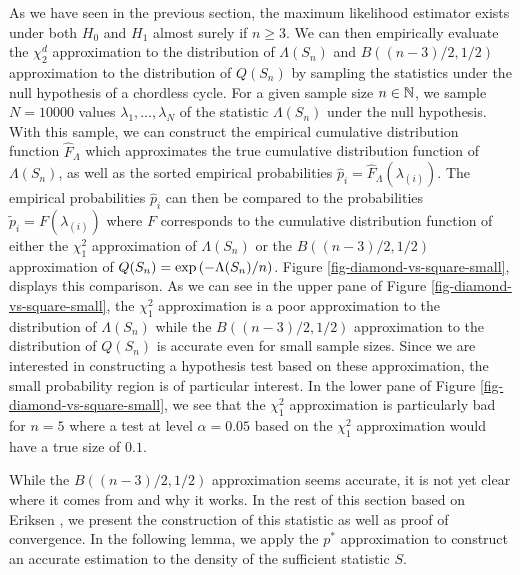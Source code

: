As we have seen in the previous section, the maximum likelihood estimator exists under both $H_0$ and $H_1$ almost surely if $n \geq 3$. We can then empirically evaluate the $\chi_2^d$ approximation to the distribution of $\Lambda(S_n)$ and $B((n - 3)/2, 1/2)$ approximation to the distribution of $Q(S_n)$ by sampling the statistics under the null hypothesis of a chordless cycle. For a given sample size $n \in \mathbb{N}$, we sample $N = 10000$ values $\lambda_1, \ldots, \lambda_N$ of the statistic $\Lambda(S_n)$ under the null hypothesis. With this sample, we can construct the empirical cumulative distribution function $\hat F_\Lambda$ which approximates the true cumulative distribution function of $\Lambda(S_n)$, as well as the sorted empirical probabilities $\hat p_{i} = \hat F_\Lambda(\lambda_{(i)})$. The empirical probabilities $\hat p_{i}$ can then be compared to the probabilities $\tilde p_i = F(\lambda_{(i)})$ where $F$ corresponds to the cumulative distribution function of either the $\chi^2_1$ approximation of $\Lambda(S_n)$ or the $B((n - 3)/2, 1/2)$ approximation of $Q(S_n) = \exp\left(-\Lambda(S_n) / n\right)$. Figure \ref{fig-diamond-vs-square-small}, displays this comparison. As we can see in the upper pane of Figure \ref{fig-diamond-vs-square-small}, the $\chi^2_1$ approximation is a poor approximation to the distribution of $\Lambda(S_n)$ while the $B((n - 3)/2, 1/2)$ approximation to the distribution of $Q(S_n)$ is accurate even for small sample sizes. Since we are interested in constructing a hypothesis test based on these approximation, the small probability region is of particular interest. In the lower pane of Figure \ref{fig-diamond-vs-square-small}, we see that the $\chi^2_1$ approximation is particularly bad for $n=5$ where a test at level $\alpha=0.05$ based on the $\chi^2_1$ approximation would have a true size of $0.1$.



While the $B((n - 3)/2, 1/2)$ approximation seems accurate, it is not yet clear where it comes from and why it works. In the rest of this section based on Eriksen \cite{eriksen1996tests}, we present the construction of this statistic as well as proof of convergence. In the following lemma, we apply the $p^*$ approximation to construct an accurate estimation to the density of the sufficient statistic $S$.

